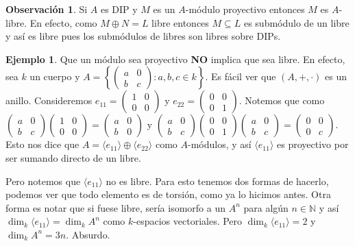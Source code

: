 \documentclass[12pt]{book}
\theoremstyle{definition}
\newtheorem{obs}[teo]{Observación}
\newtheorem{ex}[teo]{Ejemplo}
\newcommand{\NN}{\mathbb{N}}
\begin{document}
\begin{obs}
Si $A$ es DIP y $M$ es un $A$-módulo proyectivo entonces $M$ es $A$-libre. En efecto, como $M\oplus N=L$ libre entonces $M\subseteq L$ es submódulo de un libre y así es libre pues los submódulos de libres son libres sobre DIPs.
\end{obs}

\begin{ex}
Que un módulo sea proyectivo \textbf{NO} implica que sea libre. En efecto, sea $k$ un cuerpo y $A=\left\{\begin{pmatrix}a & 0 \\ b & c\end{pmatrix} : a,b,c\in k\right\}$. Es fácil ver que $(A,+,\cdot)$ es un anillo. Consideremos $e_{11} = \begin{pmatrix}1 & 0 \\ 0 & 0\end{pmatrix}$ y $e_{22} = \begin{pmatrix}0 & 0 \\ 0 & 1\end{pmatrix}$. Notemos que como $\begin{pmatrix}a & 0 \\ b & c\end{pmatrix} \begin{pmatrix}1 & 0 \\ 0 & 0\end{pmatrix} = \begin{pmatrix}a & 0 \\ b & 0\end{pmatrix}$ y $\begin{pmatrix}a & 0 \\ b & c\end{pmatrix}\begin{pmatrix} 0 & 0 \\ 0 & 1\end{pmatrix}\begin{pmatrix}a & 0 \\ b & c\end{pmatrix} = \begin{pmatrix}0 & 0 \\ 0 & c\end{pmatrix}$. Esto nos dice que $A=\langle e_{11}\rangle\oplus\langle e_{22}\rangle$ como $A$-módulos, y así $\langle e_{11}\rangle$ es proyectivo por ser sumando directo de un libre.

Pero notemos que $\langle e_{11}\rangle$ no es libre. Para esto tenemos dos formas de hacerlo, podemos ver que todo elemento es de torsión, como ya lo hicimos antes. Otra forma es notar que si fuese libre, sería isomorfo a un $A^n$ para algún $n\in\NN$ y así $\dim_k\langle e_{11}\rangle = \dim_k A^n$ como $k$-espacios vectoriales. Pero $\dim_k\langle e_{11}\rangle =2$ y $\dim_k A^n = 3n$. Absurdo.
\end{ex}
\end{document}
